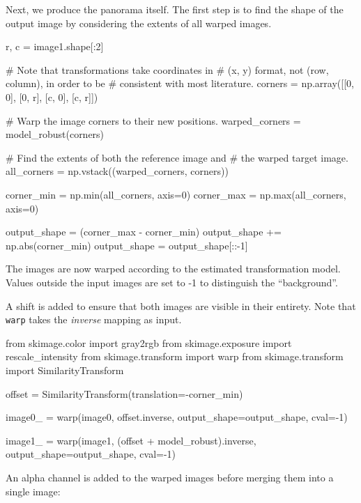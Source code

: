     Next, we produce the panorama itself. The first step is to find the shape of the output image by considering the extents of all warped images.

    \begin{pyverbatim}
      r, c = image1.shape[:2]

      # Note that transformations take coordinates in
      # (x, y) format, not (row, column), in order to be
      # consistent with most literature.
      corners = np.array([[0, 0],
                          [0, r],
                          [c, 0],
                          [c, r]])

      # Warp the image corners to their new positions.
      warped_corners = model_robust(corners)

      # Find the extents of both the reference image and
      # the warped target image.
      all_corners = np.vstack((warped_corners, corners))

      corner_min = np.min(all_corners, axis=0)
      corner_max = np.max(all_corners, axis=0)

      output_shape = (corner_max - corner_min)
      output_shape += np.abs(corner_min)
      output_shape = output_shape[::-1]
    \end{pyverbatim}

    The images are now warped according to the estimated transformation model. Values outside the input images are set to -1 to distinguish the ``background''.

    A shift is added to ensure that both images are visible in their entirety. Note that \texttt{warp} takes the \textit{inverse} mapping as input.

    \begin{pyverbatim}
      from skimage.color import gray2rgb
      from skimage.exposure import rescale_intensity
      from skimage.transform import warp
      from skimage.transform import SimilarityTransform

      offset = SimilarityTransform(translation=-corner_min)

      image0_ = warp(image0, offset.inverse,
                     output_shape=output_shape, cval=-1)

      image1_ = warp(image1, (offset + model_robust).inverse,
                     output_shape=output_shape, cval=-1)
    \end{pyverbatim}

    An alpha channel is added to the warped images before merging them into a single image:


